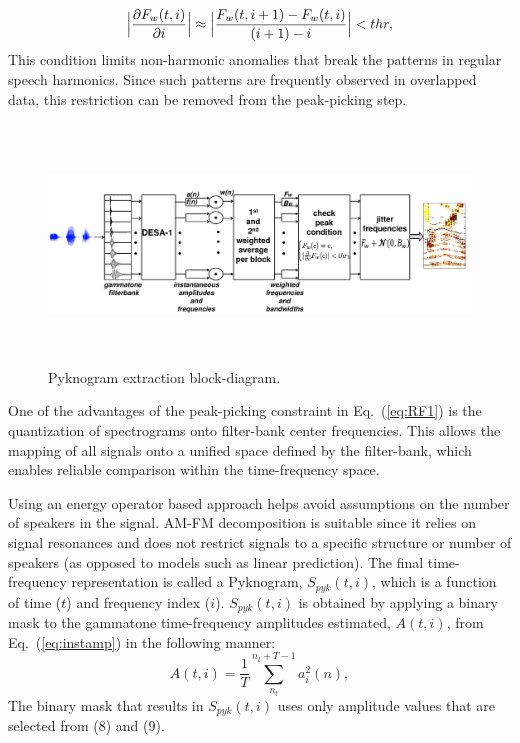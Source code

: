 {\begin{equation}
\label{eq:RF2}
\Big|\frac{\partial F_w(t,i)}{\partial i} \Big| \approx \Big|\frac{F_w(t,i+1) - F_w(t,i)}{(i+1) - i}\Big| < thr, 
\vspace{1mm}
\end{equation}
This condition limits non-harmonic anomalies that break the patterns in regular speech harmonics. 
Since such patterns are frequently observed in overlapped data, this restriction can be removed from the peak-picking step.  

\begin{figure}[h!]
	\centering
	\vspace{0mm}
	\includegraphics[height = 2.5in, width=1\textwidth]{figures/pyknogram_blockdiagram}
	\vspace{-3mm}
	\caption{ Pyknogram extraction block-diagram.}
	\label{fig:ch2_pykno_blockdiag}
	\vspace{-3mm}
\end{figure}


One of the advantages of the peak-picking constraint in Eq.~(\ref{eq:RF1}) is the quantization of spectrograms onto filter-bank center frequencies. 
This allows the mapping of all signals onto a unified space defined by the filter-bank, which enables reliable comparison within the time-frequency space. 

Using an energy operator based approach helps avoid assumptions on the number of speakers in the signal. 
AM-FM decomposition is suitable since it relies on signal resonances and does not restrict signals to a specific structure or number of speakers (as opposed to models such as linear prediction). 
The final time-frequency representation is called a Pyknogram, $S_{pyk}(t,i)$, which is a function of time ($t$) and frequency index ($i$). 
$S_{pyk}(t,i)$ is obtained by applying a binary mask to the gammatone time-frequency amplitudes estimated, $A(t,i)$, from Eq.~(\ref{eq:instamp}) in the following manner:
\begin{equation}
\label{eq:amplitude_spectrum}
A(t,i) = \frac{1}{T}\sum_{n_t}^{n_t+T - 1}a_i^2(n),
\end{equation}
The binary mask that results in $S_{pyk}(t,i)$ uses only amplitude values that are selected from (8) and (9). 


}
